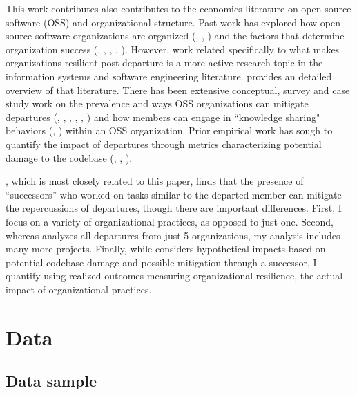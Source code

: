 \documentclass[12pt,notitlepage]{article}
\begin{document}
This work contributes also contributes to the economics literature on open source software (OSS) and organizational structure. 
Past work has explored how open source software organizations are organized (\cite{mockus_two_2002}, \cite{crowston_coordination_2005}, \cite{den_besten_allocation_2008}) and the factors that determine organization success (\cite{mustonen_copyleft--economics_2003}, \cite{fershtman_open_2007}, \cite{comino_planning_2007}, \cite{belenzon_motivation_2008}, \cite{giuri_skills_2010}). 
However, work related specifically to what makes organizations resilient post-departure is a more active research topic in the information systems and software engineering literature. 
\cite{rashid_systematic_2019} provides an detailed overview of that literature. 
There has been extensive conceptual, survey and case study work  on the prevalence and ways OSS organizations can mitigate departures (\cite{robles_evolution_2005}, \cite{hannon_retaining_2008}, \cite{westlund_retaining_2008}, \cite{xu_volunteers_2010}, \cite{yu_empirical_2012}, \cite{miller_why_2019}) and how members can engage in ``knowledge sharing" behaviors (\cite{von_krogh_community_2003}, \cite{rashid_exploring_2017}) within an OSS organization. 
Prior empirical work has sough to quantify the impact of departures through metrics characterizing potential damage to the codebase (\cite{izquierdo-cortazar_using_2009}, \cite{rigby_quantifying_2016}, \cite{nassif_revisiting_2017}). 

\cite{rigby_quantifying_2016}, which is most closely related to this paper, finds that the presence of “successors” who worked on tasks similar to the departed member can mitigate the repercussions of departures, though there are important differences. 
First, I focus on a variety of organizational practices, as opposed to just one. 
Second, whereas \cite{rigby_quantifying_2016} analyzes all departures from just 5 organizations, my analysis includes many more projects. 
Finally, while \cite{rigby_quantifying_2016} considers hypothetical impacts based on potential codebase damage and possible mitigation through a successor, I quantify using realized outcomes measuring organizational resilience, the actual impact of organizational practices. 

\newpage
\section{Data} \label{sec:data}
\subsection{Data sample}
\end{document}
